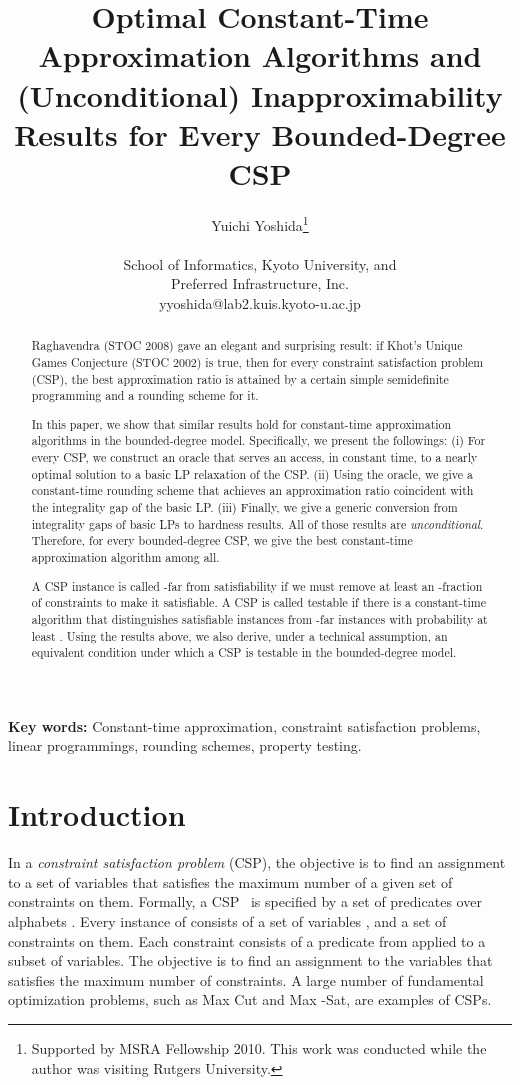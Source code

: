 \documentclass[letterpaper, 11pt]{article}
\title{Optimal Constant-Time Approximation Algorithms and (Unconditional) Inapproximability Results for Every Bounded-Degree CSP}
\author{Yuichi Yoshida\thanks{Supported by MSRA Fellowship 2010. This work was conducted while the author was visiting Rutgers University. }\\\\
  School of Informatics, Kyoto University, and\\ Preferred Infrastructure, Inc.\\yyoshida@lab2.kuis.kyoto-u.ac.jp}
\date{}
\begin{document}
\setcounter{page}{0}
\maketitle
\begin{abstract}
  Raghavendra (STOC 2008) gave an elegant and surprising result:
  if Khot's Unique Games Conjecture (STOC 2002) is true, 
  then for every constraint satisfaction problem (CSP), 
  the best approximation ratio is attained by a certain simple semidefinite programming and a rounding scheme for it.

  In this paper, 
  we show that similar results hold for constant-time approximation algorithms in the bounded-degree model.
  Specifically, we present the followings:
  (i) For every CSP, we construct an oracle that serves an access, 
  in constant time,
  to a nearly optimal solution to a basic LP relaxation of the CSP.
  (ii) Using the oracle, 
  we give a constant-time rounding scheme that achieves an approximation ratio coincident with the integrality gap of the basic LP.
  (iii) Finally, we give a generic conversion from integrality gaps of basic LPs to hardness results.
  All of those results are \textit{unconditional}.
  Therefore, for every bounded-degree CSP, 
  we give the best constant-time approximation algorithm among all.

  A CSP instance is called -far from satisfiability if we must remove at least an -fraction of constraints to make it satisfiable.
  A CSP is called testable if there is a constant-time algorithm that distinguishes satisfiable instances from -far instances with probability at least .
  Using the results above, 
  we also derive, under a technical assumption,
  an equivalent condition under which a CSP is testable in the bounded-degree model.
  \end{abstract}

{\bf Key words:} Constant-time approximation, constraint satisfaction problems, linear programmings, rounding schemes, property testing.
\newpage

\section{Introduction}
In a \textit{constraint satisfaction problem} (CSP), 
the objective is to find an assignment to a set of variables that satisfies the maximum number of a given set of constraints on them.
Formally, a CSP~ is specified by a set of predicates over alphabets .
Every instance of  consists of a set of variables ,
and a set of constraints  on them.
Each constraint consists of a predicate from  applied to a subset of variables.
The objective is to find an assignment  to the variables that satisfies the maximum number of constraints. 
A large number of fundamental optimization problems,
such as \textsf{Max Cut} and \textsf{Max -Sat},
are examples of CSPs.
\end{document}

